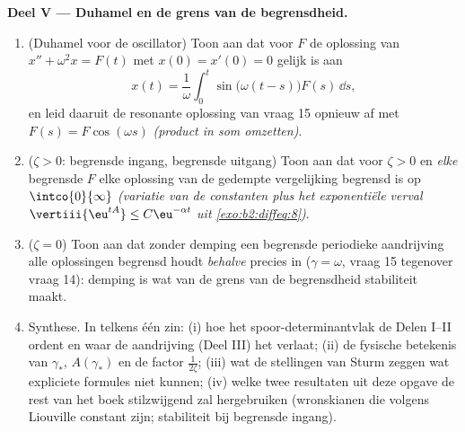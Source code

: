 \begin{problem}
\medskip
\noindent\textbf{Deel V --- Duhamel en de grens van de
begrensdheid.}
\begin{enumerate}[resume]
  \item (Duhamel voor de oscillator) Toon aan dat voor  $F$
        de oplossing van $x'' + \omega^2x = F(t)$ met $x(0) = x'(0)
        = 0$ gelijk is aan
        \[
        x(t) = \frac1\omega\int_0^t\sin\bigl(\omega(t -
        s)\bigr)F(s)\,\dd s ,
        \]
        en leid daaruit de resonante oplossing van vraag 15 opnieuw
        af met $F(s) = F\cos(\omega s)$ \emph{(product in som
        omzetten)}.
  \item ($\zeta > 0$: begrensde ingang, begrensde uitgang) Toon aan
        dat voor $\zeta > 0$ en \emph{elke} begrensde  $F$
        elke oplossing van de gedempte vergelijking begrensd is op
        $\intco{0}{\infty}$ \emph{(variatie van de constanten plus
        het exponentiële verval $\vertiii{\eu^{tA}} \leq
        C\eu^{-\alpha t}$ uit \cref{exo:b2:diffeq:8})}.
  \item ($\zeta = 0$) Toon aan dat zonder demping een begrensde
        periodieke aandrijving alle oplossingen begrensd houdt
        \emph{behalve} precies in  ($\gamma = \omega$,
        vraag 15 tegenover vraag 14): demping is wat van de grens
        van de begrensdheid  stabiliteit maakt.
  \item Synthese. In telkens één zin: (i) hoe het
        spoor-determinantvlak de Delen I--II ordent en waar de
        aandrijving (Deel III) het verlaat; (ii) de fysische
        betekenis van $\gamma_*$, $A(\gamma_*)$ en de factor
        $\frac1{2\zeta}$; (iii) wat de stellingen van Sturm zeggen
        wat expliciete formules niet kunnen; (iv) welke twee
        resultaten uit deze opgave de rest van het boek
        stilzwijgend zal hergebruiken (wronskianen die volgens
        Liouville constant zijn; stabiliteit bij begrensde ingang).
\end{enumerate}
\end{problem}
